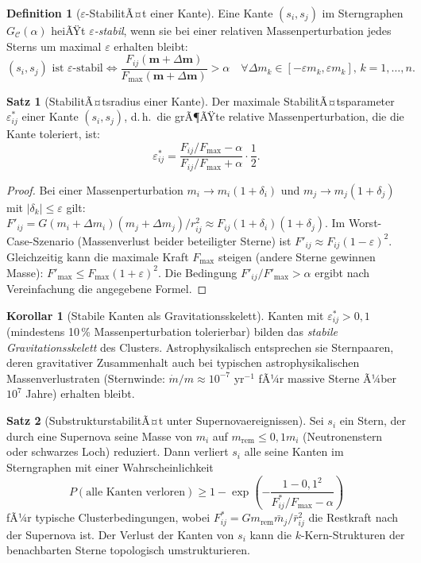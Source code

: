 ﻿\documentclass[a4paper,12pt]{report}
\theoremstyle{definition}
\newtheorem{definition}{Definition}
\newtheorem{satz}{Satz}
\newtheorem{korollar}{Korollar}
\begin{document}
\begin{definition}[$\varepsilon$-StabilitÃ¤t einer Kante]
\label{def:eps_stab}
Eine Kante $(s_i, s_j)$ im Sterngraphen $G_\mathcal{C}(\alpha)$ heiÃŸt \emph{$\varepsilon$-stabil}, wenn sie bei einer relativen Massenperturbation jedes Sterns um maximal $\varepsilon$ erhalten bleibt:
\[
(s_i, s_j) \text{ ist } \varepsilon\text{-stabil}
\iff
\frac{F_{ij}(\mathbf{m} + \Delta\mathbf{m})}{F_\mathrm{max}(\mathbf{m} + \Delta\mathbf{m})} > \alpha
\quad \forall \Delta m_k \in [-\varepsilon m_k, \varepsilon m_k],\, k = 1,\ldots,n.
\]
\end{definition}

\begin{satz}[StabilitÃ¤tsradius einer Kante]
\label{satz:stabilitaet}
Der maximale StabilitÃ¤tsparameter $\varepsilon^*_{ij}$ einer Kante $(s_i, s_j)$, d.\,h.\ die grÃ¶ÃŸte relative Massenperturbation, die die Kante toleriert, ist:
\[
\varepsilon^*_{ij} = \frac{F_{ij}/F_\mathrm{max} - \alpha}{F_{ij}/F_\mathrm{max} + \alpha} \cdot \frac{1}{2}.
\]
\end{satz}

\begin{proof}
Bei einer Massenperturbation $m_i \to m_i(1 + \delta_i)$ und $m_j \to m_j(1 + \delta_j)$ mit $|\delta_k| \leq \varepsilon$ gilt:
$F'_{ij} = G (m_i + \Delta m_i)(m_j + \Delta m_j)/r_{ij}^2 \approx F_{ij}(1 + \delta_i)(1 + \delta_j)$.
Im Worst-Case-Szenario (Massenverlust beider beteiligter Sterne) ist $F'_{ij} \approx F_{ij}(1-\varepsilon)^2$. Gleichzeitig kann die maximale Kraft $F_\mathrm{max}$ steigen (andere Sterne gewinnen Masse): $F'_\mathrm{max} \leq F_\mathrm{max}(1+\varepsilon)^2$. Die Bedingung $F'_{ij}/F'_\mathrm{max} > \alpha$ ergibt nach Vereinfachung die angegebene Formel.
\end{proof}

\begin{korollar}[Stabile Kanten als Gravitationsskelett]
\label{kor:stabile_kanten}
Kanten mit $\varepsilon^*_{ij} > 0{,}1$ (mindestens 10\,\% Massenperturbation tolerierbar) bilden das \emph{stabile Gravitationsskelett} des Clusters. Astrophysikalisch entsprechen sie Sternpaaren, deren gravitativer Zusammenhalt auch bei typischen astrophysikalischen Massenverlustraten (Sternwinde: $\dot{m}/m \approx 10^{-7}$ yr$^{-1}$ fÃ¼r massive Sterne Ã¼ber $10^7$ Jahre) erhalten bleibt.
\end{korollar}

\begin{satz}[SubstrukturstabilitÃ¤t unter Supernovaereignissen]
\label{satz:supernova}
Sei $s_i$ ein Stern, der durch eine Supernova seine Masse von $m_i$ auf $m_\mathrm{rem} \leq 0{,}1 m_i$ (Neutronenstern oder schwarzes Loch) reduziert. Dann verliert $s_i$ alle seine Kanten im Sterngraphen mit einer Wahrscheinlichkeit
\[
P(\text{alle Kanten verloren}) \geq 1 - \exp\!\left(-\frac{1-0{,}1^2}{F_{ij}^*/F_\mathrm{max} - \alpha}\right)
\]
fÃ¼r typische Clusterbedingungen, wobei $F_{ij}^* = G m_\mathrm{rem} \bar{m}_j / \bar{r}_{ij}^2$ die Restkraft nach der Supernova ist. Der Verlust der Kanten von $s_i$ kann die $k$-Kern-Strukturen der benachbarten Sterne topologisch umstrukturieren.
\end{satz}
\end{document}
